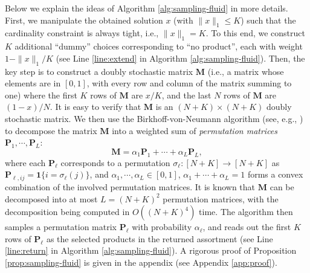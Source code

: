 \documentclass[opre]{informs3aa}
\newcommand{\vct}{\boldsymbol }
\newcommand{\mat}{\mathbf }
\newcommand{\Authornote}[2]{{\small\textcolor{DSgray}{\sf$<<<${  #1: #2
			}$>>>$}}}
\newcommand{\xnote}[1]{{\Authornote{Xi}{#1}}}
\begin{document}
Below we explain the ideas of Algorithm \ref{alg:sampling-fluid} in more details. First, we manipulate the obtained solution $x$ (with $\|x\|_1 \leq K$) such that the cardinality constraint is always tight, i.e.,  $\|x\|_1=K$. To this end, we construct $K$ additional ``dummy'' choices corresponding to ``no product'', each with weight $1-\|x\|_1/K$ (see Line \ref{line:extend} in Algorithm \ref{alg:sampling-fluid}).
Then, the key step is to construct a doubly stochastic matrix $\mat M$ (i.e., a matrix whose elements are in $[0,1]$, with every row and column of the matrix summing to one)
where the first $K$ rows of $\mat M$ are $x/K$, and the last $N$ rows of $\mat M$ are $(1-x)/N$. It is easy to verify that $\mat M$ is an $(N+K)\times (N+K)$
doubly stochastic matrix.  %
We then use the Birkhoff-von-Neumann algorithm (see, e.g., \cite{dufosse2016notes}) to decompose the matrix $\mat M$ into a weighted
sum of \emph{permutation matrices} $\mat P_1,\cdots,\mat P_L$:
$$
\mat M = \alpha_1\mat P_1 + \cdots + \alpha_L\mat P_L,
$$
where each $\mat P_\ell$ corresponds to a permutation $\sigma_\ell: [N+K]\to[N+K]$ as $\mat P_{\ell,ij} = \vct 1\{i=\sigma_\ell(j)\}$,
{and $\alpha_1,\cdots,\alpha_L\in[0,1]$, $\alpha_1+\cdots+\alpha_L=1$ forms a convex combination of the involved permutation matrices.}
It is known that $\mat M$ can be decomposed into at most $L=(N+K)^2$ permutation matrices, with the decomposition being computed in $O((N+K)^4)$ time.
The algorithm then samples a permutation matrix $\mat P_\ell$ with probability $\alpha_\ell$, and reads out the first $K$ rows of $\mat P_\ell$
as the selected products in the returned assortment (see Line \ref{line:return} in Algorithm \ref{alg:sampling-fluid}).
A rigorous proof of Proposition \ref{prop:sampling-fluid} is given in the appendix (see Appendix \ref{app:proof}).
\end{document}

